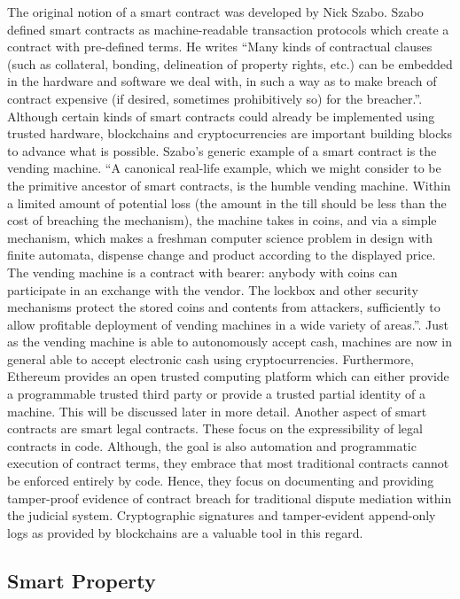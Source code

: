 The original notion of a smart contract was developed by Nick Szabo. Szabo defined smart contracts as machine-readable transaction protocols which create a contract with pre-defined terms. He writes “Many kinds of contractual clauses (such as collateral, bonding, delineation of property rights, etc.) can be embedded in the hardware and software we deal with, in such a way as to make breach of contract expensive (if desired, sometimes prohibitively so) for the breacher.”.  Although certain kinds of smart contracts could already be implemented using trusted hardware, blockchains and cryptocurrencies are important building blocks to advance what is possible. Szabo’s generic example of a smart contract is the vending machine. 
“A canonical real-life example, which we might consider to be the primitive ancestor of smart contracts, is the humble vending machine. Within a limited amount of potential loss (the amount in the till should be less than the cost of breaching the mechanism), the machine takes in coins, and via a simple mechanism, which makes a freshman computer science problem in design with finite automata, dispense change and product according to the displayed price. The vending machine is a contract with bearer: anybody with coins can participate in an exchange with the vendor. The lockbox and other security mechanisms protect the stored coins and contents from attackers, sufficiently to allow profitable deployment of vending machines in a wide variety of areas.”. Just as the vending machine is able to autonomously accept cash, machines are now in general able to accept electronic cash using cryptocurrencies.  Furthermore, Ethereum provides an open trusted computing platform which can either provide a programmable trusted third party or provide a trusted partial identity of a machine. This will be discussed later in more detail. Another aspect of smart contracts are smart legal contracts. These focus on the expressibility of legal contracts in code. Although, the goal is also automation and programmatic execution of contract terms, they embrace that most traditional contracts cannot be enforced entirely by code. Hence, they focus on documenting and providing tamper-proof evidence of contract breach for traditional dispute mediation within the judicial system. Cryptographic signatures and tamper-evident append-only logs as provided by blockchains are a valuable tool in this regard.

\subsection{Smart Property}
\label{sec:econdev:smartproperty}

